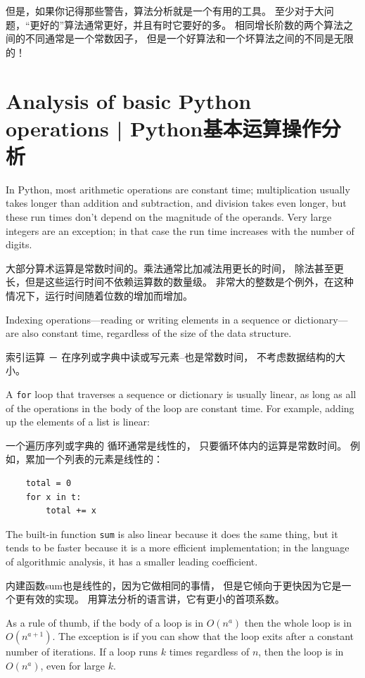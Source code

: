 但是，如果你记得那些警告，算法分析就是一个有用的工具。
至少对于大问题，“更好的”算法通常更好，并且有时它要好的多。
相同增长阶数的两个算法之间的不同通常是一个常数因子，
但是一个好算法和一个坏算法之间的不同是无限的！


\section{Analysis of basic Python operations  |  Python基本运算操作分析}

In Python, most arithmetic operations are constant time;
multiplication usually takes longer than addition and subtraction, and
division takes even longer, but these run times don't depend on the
magnitude of the operands.  Very large integers are an exception; in
that case the run time increases with the number of digits.

大部分算术运算是常数时间的。乘法通常比加减法用更长的时间，
除法甚至更长，但是这些运行时间不依赖运算数的数量级。
非常大的整数是个例外，在这种情况下，运行时间随着位数的增加而增加。

Indexing operations---reading or writing elements in a sequence
or dictionary---are also constant time, regardless of the size
of the data structure.

索引运算 － 在序列或字典中读或写元素–也是常数时间， 不考虑数据结构的大小。

A {\tt for} loop that traverses a sequence or dictionary is
usually linear, as long as all of the operations in the body
of the loop are constant time.  For example, adding up the
elements of a list is linear:

一个遍历序列或字典的  循环通常是线性的， 只要循环体内的运算是常数时间。
例如，累加一个列表的元素是线性的：


\begin{lstlisting}
    total = 0
    for x in t:
        total += x
\end{lstlisting}

The built-in function {\tt sum} is also linear because it does
the same thing, but it tends to be faster because it is a more
efficient implementation; in the language of algorithmic analysis,
it has a smaller leading coefficient.

内建函数sum也是线性的，因为它做相同的事情，
但是它倾向于更快因为它是一个更有效的实现。
用算法分析的语言讲，它有更小的首项系数。

As a rule of thumb, if the body of a loop is in $O(n^a)$ then
the whole loop is in $O(n^{a+1})$.  The exception is if you can
show that the loop exits after a constant number of iterations.
If a loop runs $k$ times regardless of $n$, then
the loop is in $O(n^a)$, even for large $k$.



